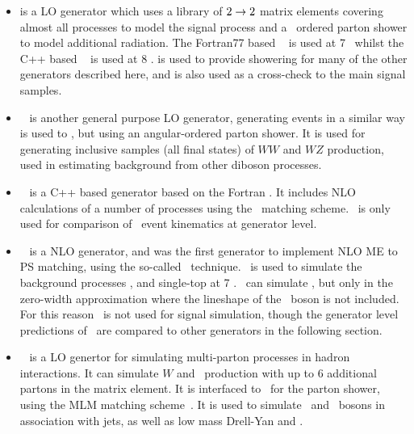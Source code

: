 \begin{itemize}
    \item \pythia is a LO generator which uses a library of $2\rightarrow2$
    matrix elements covering almost all \sm processes to model the signal
    process and a \pt\ ordered parton shower to model additional radiation.
    The Fortran77 based
    ~\cite{pythia} is used at 7 \tev\, whilst the C++ based
    ~\cite{Sjostrand:2007gs} is used at 8 \tev. \pythia is used to
    provide showering for many of the other generators described here, and is
    also used as a cross-check to the main signal samples.

    \item \herwig~\cite{Herwig} is another general purpose LO generator, generating events in a
    similar way is used to \pythia, but using an angular-ordered parton shower.
    It is used for generating inclusive samples (all final
    states) of $WW$ and $WZ$ production, used in estimating background from
    other diboson processes.

    \item \herwigPP~\cite{Bahr:2008pv} is a C++ based generator based on the
    Fortran \herwig. It includes NLO calculations of a number of processes
    using the \powheg\ matching scheme. \herwigPP\ is only used for comparison
    of \ZZ\ event kinematics at generator level.

    \item \mcatnlo~\cite{bib:mcatnlo} is a NLO generator, and was the first
    generator to implement NLO ME to PS matching, using the so-called \mcatnlo\
    technique. \mcatnlo\ is used to simulate the background processes \ttbar, \Wt
    and single-top at 7 \tev. \mcatnlo\ can simulate \qqZZ, but only in the
    zero-width approximation where the lineshape of the \Z\ boson is not
    included. For this reason \mcatnlo\ is not used for signal simulation,
    though the generator level predictions of \mcatnlo\ are compared to other
    generators in the following section.

    \item \alpgen~\cite{alpgen} is a LO genertor for simulating multi-parton
    processes in hadron interactions. It can simulate $W$ and \Z\ production
    with up to 6 additional partons in the matrix element. It is interfaced to
    \herwig\ for the parton shower, using the MLM matching
    scheme~\cite{Mangano2002343}. It is used to simulate \W\ and \Z\ bosons in
    association with jets, as well as low mass Drell-Yan and \Wg.



\end{itemize}

